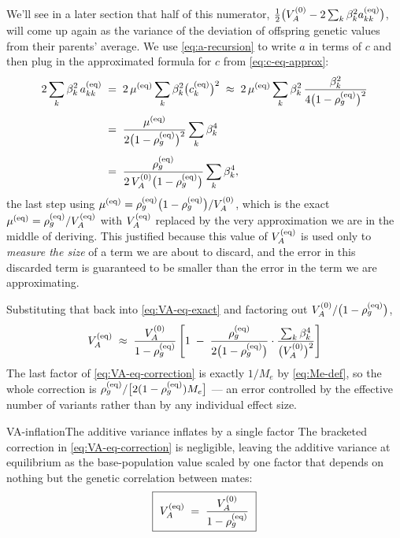 \documentclass[12pt]{article}
\begin{document}
We'll see in a later section that half of this numerator, $\tfrac12\big(V_A^{(0)} - 2\sum_k \beta_k^2 a^{(\mathrm{eq})}_{kk}\big)$, will come up again as the variance of the deviation of offspring genetic values from their parents' average.
We use \eqref{eq:a-recursion} to write $a$ in terms of $c$ and then plug in the approximated formula for $c$ from \eqref{eq:c-eq-approx}:
\begin{equation}\label{eq:VA-eq-drag}
\begin{aligned}
    2\sum_k \beta_k^2\, a^{(\mathrm{eq})}_{kk}
    \;&=\; 2\,\mu^{(\mathrm{eq})} \sum_k \beta_k^2 \big(c^{(\mathrm{eq})}_k\big)^2
    \;\approx\; 2\,\mu^{(\mathrm{eq})} \sum_k \beta_k^2\,\frac{\beta_k^2}{4\big(1-\rho_g^{(\mathrm{eq})}\big)^2} \\[4pt]
    \;&=\; \frac{\mu^{(\mathrm{eq})}}{2\big(1-\rho_g^{(\mathrm{eq})}\big)^2}\sum_k \beta_k^4 \\[4pt]
    \;&=\; \frac{\rho_g^{(\mathrm{eq})}}{2\,V_A^{(0)}\big(1-\rho_g^{(\mathrm{eq})}\big)}\sum_k \beta_k^4 ,
\end{aligned}
\end{equation}
the last step using $\mu^{(\mathrm{eq})} = \rho_g^{(\mathrm{eq})}\big(1-\rho_g^{(\mathrm{eq})}\big)/V_A^{(0)}$, which is the exact $\mu^{(\mathrm{eq})} = \rho_g^{(\mathrm{eq})}/V_A^{(\mathrm{eq})}$ with $V_A^{(\mathrm{eq})}$ replaced by the very approximation we are in the middle of deriving.
This justified because this value of $V_A^{(\mathrm{eq})}$ is used only to \emph{measure the size} of a term we are about to discard, and the error in this discarded term is guaranteed to be smaller than the error in the term we are approximating.

Substituting that back into \eqref{eq:VA-eq-exact} and factoring out $V_A^{(0)}/\big(1-\rho_g^{(\mathrm{eq})}\big)$,
\begin{equation}\label{eq:VA-eq-correction}
    V_A^{(\mathrm{eq})} \;\approx\; \frac{V_A^{(0)}}{1-\rho_g^{(\mathrm{eq})}}\left[1 \;-\; \frac{\rho_g^{(\mathrm{eq})}}{2\big(1-\rho_g^{(\mathrm{eq})}\big)} \cdot \frac{\sum_k \beta_k^4}{\big(V_A^{(0)}\big)^2}\right]
\end{equation}
The last factor of \eqref{eq:VA-eq-correction} is exactly $1/M_e$ by \eqref{eq:Me-def}, so the whole correction is $\rho_g^{(\mathrm{eq})}/\big[2(1-\rho_g^{(\mathrm{eq})})M_e\big]$ --- an error controlled by the effective number of variants rather than by any individual effect size.

\begin{approximation}{VA-inflation}{The additive variance inflates by a single factor}
The bracketed correction in \eqref{eq:VA-eq-correction} is negligible, leaving the additive variance at equilibrium as the base-population value scaled by one factor that depends on nothing but the genetic correlation between mates:
\begin{equation}\label{eq:VA-eq}
    \boxed{\ V_A^{(\mathrm{eq})} \;=\; \frac{V_A^{(0)}}{1-\rho_g^{(\mathrm{eq})}}\ }
\end{equation}
\end{approximation}
\end{document}
